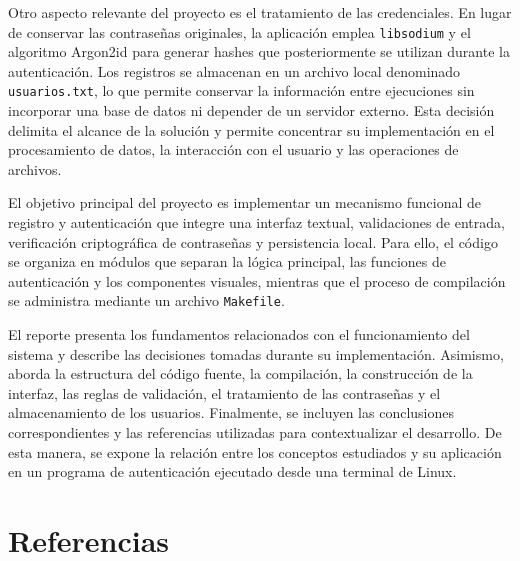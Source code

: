 \documentclass[11pt, letterpaper]{article}
\begin{document}
Otro aspecto relevante del proyecto es el tratamiento de las credenciales.
En lugar de conservar las contraseñas originales, la aplicación emplea \texttt{libsodium} y el algoritmo Argon2id para generar hashes que posteriormente se utilizan durante la autenticación.
Los registros se almacenan en un archivo local denominado \texttt{usuarios.txt}, lo que permite conservar la información entre ejecuciones sin incorporar una base de datos ni depender de un servidor externo.
Esta decisión delimita el alcance de la solución y permite concentrar su implementación en el procesamiento de datos, la interacción con el usuario y las operaciones de archivos.

El objetivo principal del proyecto es implementar un mecanismo funcional de registro y autenticación que integre una interfaz textual, validaciones de entrada, verificación criptográfica de contraseñas y persistencia local.
Para ello, el código se organiza en módulos que separan la lógica principal, las funciones de autenticación y los componentes visuales, mientras que el proceso de compilación se administra mediante un archivo \texttt{Makefile}.

El reporte presenta los fundamentos relacionados con el funcionamiento del sistema y describe las decisiones tomadas durante su implementación.
Asimismo, aborda la estructura del código fuente, la compilación, la construcción de la interfaz, las reglas de validación, el tratamiento de las contraseñas y el almacenamiento de los usuarios.
Finalmente, se incluyen las conclusiones correspondientes y las referencias utilizadas para contextualizar el desarrollo.
De esta manera, se expone la relación entre los conceptos estudiados y su aplicación en un programa de autenticación ejecutado desde una terminal de Linux.

\newpage



\FloatBarrier


\newpage

\newpage
{}
\section{Referencias}
\end{document}
